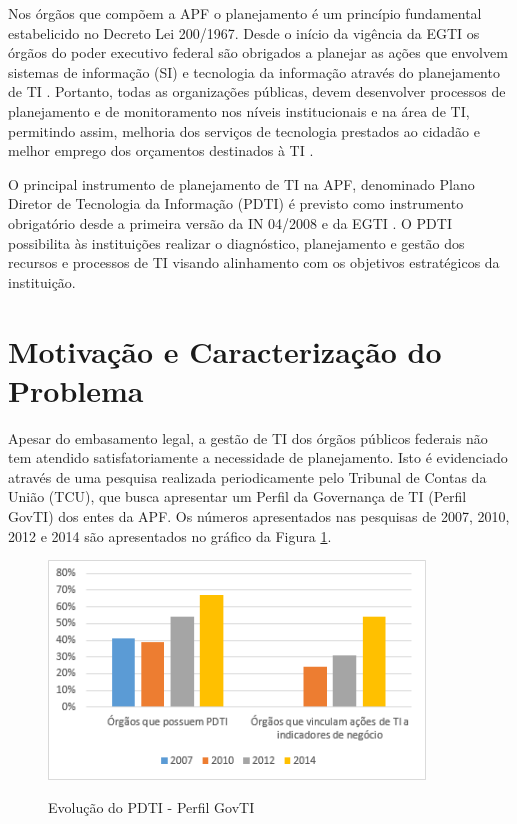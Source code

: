 Nos órgãos que compõem a APF o planejamento é um princípio fundamental estabelicido no Decreto Lei 200/1967. Desde o início da vigência da EGTI os órgãos do poder executivo federal são obrigados a planejar as ações que envolvem sistemas de informação (SI) e tecnologia da informação através do planejamento de TI \cite{egti:08}. Portanto, todas as organizações públicas, devem desenvolver processos de planejamento e de monitoramento nos níveis institucionais e na área de TI, permitindo assim, melhoria dos serviços de tecnologia prestados ao cidadão e melhor emprego dos orçamentos destinados à TI \cite{tcuManual:07}. 

O principal instrumento de planejamento de TI na APF, denominado Plano Diretor de Tecnologia da Informação (PDTI) é previsto como instrumento obrigatório desde a primeira versão da IN 04/2008 e da EGTI \cite{in04:08, egti:08}. O PDTI possibilita às instituições realizar o diagnóstico, planejamento e gestão dos recursos e processos de TI visando alinhamento com os objetivos estratégicos da instituição.


\section{Motivação e Caracterização do Problema}

Apesar do embasamento legal, a gestão de TI dos órgãos públicos federais não tem atendido satisfatoriamente a necessidade de planejamento. Isto é evidenciado através de uma pesquisa realizada periodicamente pelo Tribunal de Contas da União (TCU), que busca apresentar um Perfil da Governança de TI (Perfil GovTI) dos entes da APF. Os números apresentados nas pesquisas de 2007, 2010, 2012 e 2014 \cite{tcu:14} são apresentados no gráfico da Figura \ref{figura:grafico_tcu}.

\begin{figure}[h]
\centering %
\includegraphics[width=10cm]{figuras/grafico_tcu.png}
\label{figura:grafico_tcu}
\caption{Evolução do PDTI - Perfil GovTI}
\end{figure}

